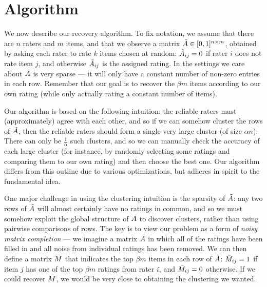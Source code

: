 \section{Algorithm}
\label{sec:algorithm}


We now describe our recovery algorithm. To fix notation, we assume that 
there are $n$ raters and $m$ items, and that we observe a matrix 
$\tilde{A} \in [0,1]^{n \times m}$, obtained by asking each rater to rate $k$ 
items chosen at random: $\tilde{A}_{ij} = 0$ if rater $i$ does not rate item 
$j$, and otherwise $\tilde{A}_{ij}$ is the assigned rating. In the settings we 
care about $\tilde{A}$ is very sparse --- it will only have a constant number of 
non-zero entries in each row. Remember that our goal is to recover the 
$\beta m$ items according to our own rating (while only actually rating a 
constant number of items).

Our algorithm is based on the following intuition: the reliable raters must 
(approximately) agree with each other, and so if we can somehow cluster the 
rows of $\tilde{A}$, then the reliable raters should form a single very large cluster 
(of size $\alpha n$). There can only be $\frac{1}{\alpha}$ such clusters, and 
so we can manually check the accuracy of each large cluster (for instance, 
by randomly selecting some ratings and comparing them to our own rating) and 
then choose the best one.
Our algorithm differs from this outline due to various 
optimizations, but adheres in spirit to the fundamental idea. 



One major challenge in using the clustering intuition is the sparsity of 
$\tilde{A}$: any two rows of $\tilde{A}$ will almost certainly have no ratings in common, 
and so we must somehow exploit the global structure of $\tilde{A}$ to discover 
clusters, rather than using pairwise comparisons of rows.
The key is to view our problem as a form of \emph{noisy matrix completion} --- 
we imagine a matrix $\bar{A}$ in which all of the ratings have been filled in 
and all noise from individual ratings has been removed. We can then define a 
matrix $\bar{M}$ that indicates the top $\beta m$ items in each row of $\bar{A}$: 
$\bar{M}_{ij} = 1$ if item $j$ has one of the top $\beta m$ ratings from rater $i$, 
and $\bar{M}_{ij} = 0$ otherwise. If we could recover $\bar{M}$, we would be very 
close to obtaining the clustering we wanted.

